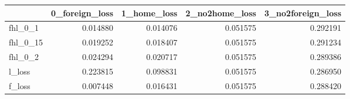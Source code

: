 \begin{tabular}{lrrrr}
\toprule
 & 0_foreign_loss & 1_home_loss & 2_no2home_loss & 3_no2foreign_loss \\
\midrule
fhl_0_1 & 0.014880 & 0.014076 & 0.051575 & 0.292191 \\
fhl_0_15 & 0.019252 & 0.018407 & 0.051575 & 0.291234 \\
fhl_0_2 & 0.024294 & 0.020717 & 0.051575 & 0.289386 \\
l_loss & 0.223815 & 0.098831 & 0.051575 & 0.286950 \\
f_loss & 0.007448 & 0.016431 & 0.051575 & 0.288420 \\
\bottomrule
\end{tabular}
